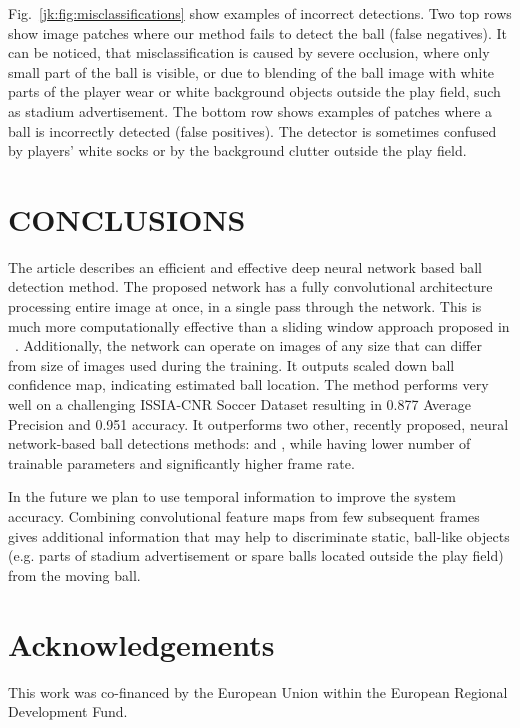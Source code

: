 \documentclass[a4paper,twoside]{article}
\begin{document}
Fig.~\ref{jk:fig:misclassifications} show examples of incorrect detections. Two top rows show image patches where our method fails to detect the ball (false negatives). It can be noticed, that misclassification is caused by severe occlusion, where only small part of the ball is visible, or due to blending of the ball image with white parts of the player wear or white background objects outside the play field, such as stadium advertisement. The bottom row shows examples of patches where a ball is incorrectly detected (false positives). The detector is sometimes confused by players' white socks or by the background clutter outside the play field.



\section{\uppercase{Conclusions}}
\noindent

The article describes an efficient and effective deep neural network based ball detection method. 
The proposed network has a fully convolutional architecture processing entire image at once, in a single pass through the network. This is much more computationally effective than a sliding window approach proposed in ~\cite{Reno18}. Additionally, the network can operate on images of any size that can differ from size of images used during the training.
It outputs scaled down ball confidence map, indicating estimated ball location. The method performs very well on a challenging ISSIA-CNR Soccer Dataset \cite{DOr09} resulting in 0.877 Average Precision and 0.951 accuracy. 
It outperforms two other, recently proposed, neural network-based ball detections methods: \cite{Spec17} and \cite{Reno18}, while having lower number of trainable parameters and significantly higher frame rate.

In the future we plan to use temporal information to improve the system accuracy. Combining convolutional feature maps from few subsequent frames gives additional information that may help to discriminate static, ball-like objects (e.g. parts of stadium advertisement or spare balls located outside the play field) from the moving ball.



\section*{Acknowledgements}
This work was co-financed by the European Union within the European Regional Development Fund.


{\small
}

\vfill
\end{document}
